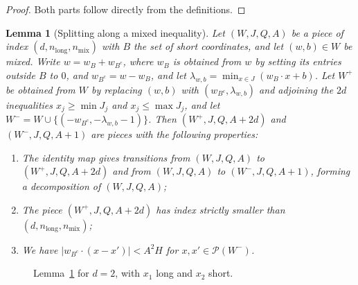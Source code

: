 \documentclass[a4paper,reqno,12pt]{amsart}
\theoremstyle{plain}
\newtheorem{lemma}[theorem]{Lemma}
\theoremstyle{plain}
\theoremstyle{remark}
\theoremstyle{plain}
\newcommand{\cP}{\mathscr{P}}
\theoremstyle{plain}
\theoremstyle{plain}
\begin{document}
{\begin{proof}
Both parts follow directly from the definitions.
\end{proof}

\begin{lemma}[Splitting along a mixed inequality]\label{lem:split}
Let $(W,J,Q,A)$ be a piece of index $(d,n_{\mathrm{long}},n_{\mathrm{mix}})$ with $B$ the set of 
short coordinates, and let $(w,b)\in W$ be mixed. Write $w=w_B+w_{B^c}$, 
where $w_B$ is obtained from $w$ by setting its entries outside $B$ to $0$,
and $w_{B^c}=w-w_B$, and let $\lambda_{w,b}=\min_{x\in J}(w_B\cdot x+b)$. Let $W^+$ be
obtained from $W$ by replacing $(w,b)$ with $(w_{B^c},\lambda_{w,b})$ and adjoining the $2d$ inequalities
$x_j\ge\min J_j$ and $x_j\le\max J_j$, and let $W^-=W\cup\{(-w_{B^c},-\lambda_{w,b}-1)\}$. Then
$(W^+,J,Q,A+2d)$ and $(W^-,J,Q,A+1)$ are pieces {with the following properties:}
\begin{enumerate}
\item The identity map gives transitions from $(W,J,Q,A)$ to $(W^+,J,Q,A+2d)$ and from $(W,J,Q,A)$ to $(W^-,J,Q,A+1)$, forming a
decomposition of $(W,J,Q,A)$;
\item The piece $(W^+,J,Q,A+2d)$ has index strictly smaller than $(d,n_{\mathrm{long}},n_{\mathrm{mix}})$;
\item We have $|w_{B^c}\cdot(x-x')|<A^2H$ for $x,x'\in\cP(W^-)$.
\end{enumerate}
\end{lemma}

\begin{figure}[ht]
\centering
{}
\caption{Lemma~\ref{lem:split} for $d=2$, with $x_1$ long and $x_2$ short.}\label{fig:split}
\end{figure}

}
\end{document}
